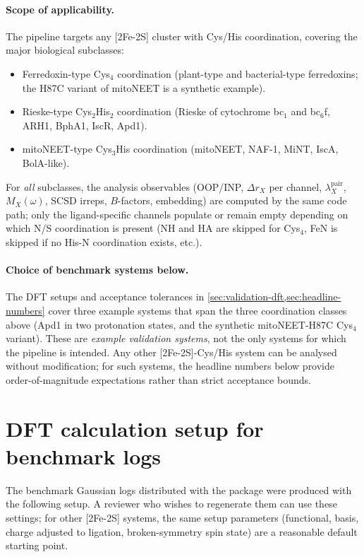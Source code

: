 \documentclass[10pt,a4paper,twoside]{article}
\begin{document}
\paragraph{Scope of applicability.}
The pipeline targets any [2Fe-2S] cluster with Cys/His
coordination, covering the major biological subclasses:
\begin{itemize}
  \item Ferredoxin-type Cys$_4$ coordination
        (plant-type and bacterial-type ferredoxins; the H87C
        variant of mitoNEET is a synthetic example).
  \item Rieske-type Cys$_2$His$_2$ coordination
        (Rieske of cytochrome bc$_1$ and bc$_6$f, ARH1, BphA1,
        IscR, Apd1).
  \item mitoNEET-type Cys$_3$His coordination
        (mitoNEET, NAF-1, MiNT, IscA, BolA-like).
\end{itemize}
For \emph{all} subclasses, the analysis observables (OOP/INP,
$\Delta r_X$ per channel, $\lambda_X^\text{pair}$, $M_X(\omega)$,
SCSD irreps, $B$-factors, embedding) are computed by the same
code path; only the ligand-specific channels populate or remain
empty depending on which N/S coordination is present (NH and
HA are skipped for Cys$_4$, FeN is skipped if no His-N
coordination exists, etc.).

\paragraph{Choice of benchmark systems below.}
The DFT setups and acceptance tolerances in
\cref{sec:validation-dft,sec:headline-numbers} cover three
example systems that span the three coordination classes above
(Apd1 in two protonation states, and the synthetic mitoNEET-H87C
Cys$_4$ variant). These are \emph{example validation systems},
not the only systems for which the pipeline is intended. Any
other [2Fe-2S]-Cys/His system can be analysed without
modification; for such systems, the headline numbers below
provide order-of-magnitude expectations rather than strict
acceptance bounds.

\section{DFT calculation setup for benchmark logs}
\label{sec:validation-dft}

The benchmark Gaussian logs distributed with the package were
produced with the following setup. A reviewer who wishes to
regenerate them can use these settings; for other [2Fe-2S]
systems, the same setup parameters (functional, basis, charge
adjusted to ligation, broken-symmetry spin state) are a
reasonable default starting point.
\end{document}

